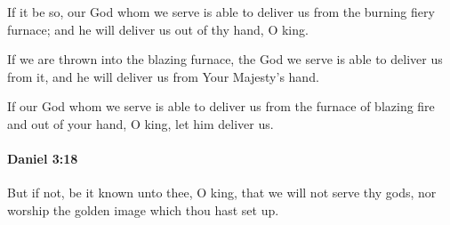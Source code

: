 			\begin{versebox}
					\item[BHS] 
					\item[LXX] 
					\item[ASV] If it be so, our God whom we serve is able to deliver us from the burning fiery furnace; and he will deliver us out of thy hand, O king.
					\item[NIV] If we are thrown into the blazing furnace, the God we serve is able to deliver us from it, and he will deliver us from Your Majesty’s hand.
					\item[NRSV] If our God whom we serve is able to deliver us from the furnace of blazing fire and out of your hand, O king, let him deliver us.
			\end{versebox}

		\paragraph{Daniel 3:18} %
			\label{DANIEL-3-18}

			But if not, be it known unto thee, O king, that we will not serve thy gods, nor worship the golden image which thou hast set up.

